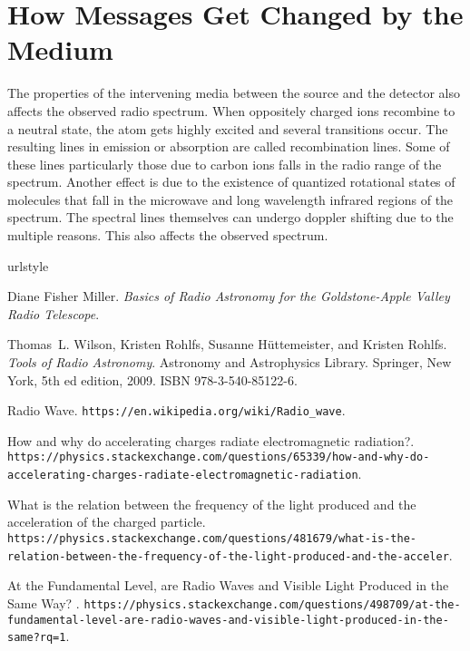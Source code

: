 \documentclass{../template/texnote}
\begin{document}
\section{How Messages Get Changed by the Medium}
The properties of the intervening media between the source and the detector also affects the observed radio spectrum. When oppositely charged ions recombine to a neutral state, the atom gets highly excited and several transitions occur. The resulting lines in emission or absorption are called recombination lines. Some of these lines particularly those due to carbon ions falls in the radio range of the spectrum. Another effect is due to the existence of quantized rotational states of molecules that fall in the microwave and long wavelength infrared regions of the spectrum. The spectral lines themselves can undergo doppler shifting due to the multiple reasons. This also affects the observed spectrum.


\begin{thebibliography}{6}
\providecommand{\natexlab}[1]{#1}
\providecommand{\url}[1]{\texttt{#1}}
\expandafter\ifx\csname urlstyle\endcsname\relax
  \providecommand{\doi}[1]{doi: #1}\else
  \providecommand{\doi}{doi: \begingroup \urlstyle{rm}\Url}\fi

Diane Fisher Miller.
\newblock \emph{Basics of Radio Astronomy for the Goldstone-Apple Valley Radio Telescope}.

Thomas~L. Wilson, Kristen Rohlfs, Susanne H{\"u}ttemeister, and Kristen Rohlfs.
\newblock \emph{Tools of Radio Astronomy}.
\newblock Astronomy and Astrophysics Library. Springer, New York, 5th ed
  edition, 2009.
\newblock ISBN 978-3-540-85122-6.

{Radio Wave}.
\newblock \url{https://en.wikipedia.org/wiki/Radio_wave}.

{How and why do accelerating charges radiate electromagnetic radiation?}.
\newblock \url{https://physics.stackexchange.com/questions/65339/how-and-why-do-accelerating-charges-radiate-electromagnetic-radiation}.

{What is the relation between the frequency of the light produced and the acceleration of the charged particle}.
\newblock \url{https://physics.stackexchange.com/questions/481679/what-is-the-relation-between-the-frequency-of-the-light-produced-and-the-acceler}.

{At the Fundamental Level, are Radio Waves and Visible Light Produced in the Same Way?
}.
\newblock \url{https://physics.stackexchange.com/questions/498709/at-the-fundamental-level-are-radio-waves-and-visible-light-produced-in-the-same?rq=1}.
\end{thebibliography}
\end{document}
